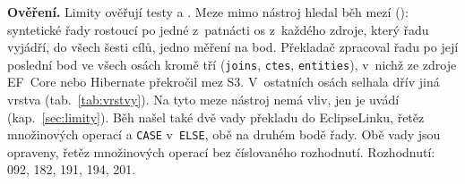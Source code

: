 \textbf{Ověření.} Limity ověřují testy  a . Meze mimo nástroj hledal běh mezí (): syntetické řady rostoucí po jedné z~patnácti os z~každého zdroje, který řadu vyjádří, do všech šesti cílů, jedno měření na bod. Překladač zpracoval řadu po její poslední bod ve všech osách kromě tří (\texttt{joins}, \texttt{ctes}, \texttt{entities}), v~nichž ze zdroje EF~Core nebo Hibernate překročil mez S3. V~ostatních osách selhala dřív jiná vrstva (tab.~\ref{tab:vrstvy}). Na tyto meze nástroj nemá vliv, jen je uvádí (kap.~\ref{sec:limity}). Běh našel také dvě vady překladu do EclipseLinku, řetěz množinových operací a \texttt{CASE} v~\texttt{ELSE}, obě na druhém bodě řady. Obě vady jsou opraveny, řetěz množinových operací bez číslovaného rozhodnutí. Rozhodnutí: 092, 182, 191, 194, 201.

